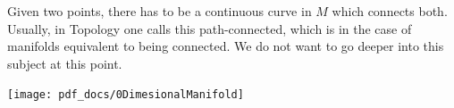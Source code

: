 \documentclass[
]{book}
\theoremstyle{definition}
\theoremstyle{definition}
\theoremstyle{definition}
\theoremstyle{definition}
\theoremstyle{remark}
\begin{document}
Given two points, there has to be a continuous curve in \(M\) which connects both. Usually, in Topology one calls this path-connected, which is in the case of manifolds equivalent to being connected. We do not want to go deeper into this subject at this point.

\begin{center}\texttt{[image: pdf\_docs/0DimesionalManifold]} \end{center}

  
\end{document}
